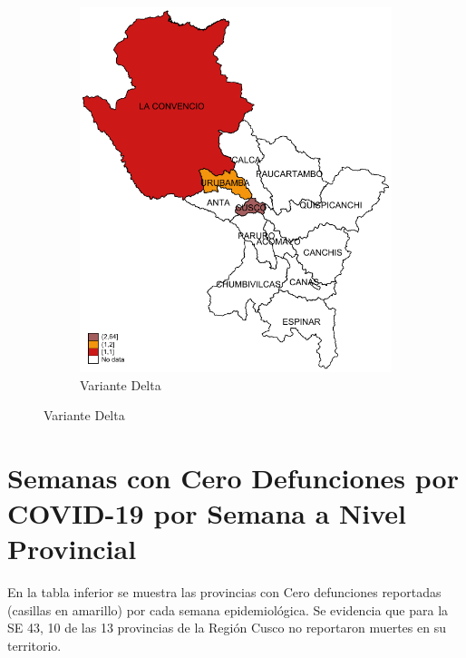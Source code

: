\documentclass[12pt,a4paper,openany]{book}
\begin{document}
\begin{figure}[h]
				\vspace{10mm}
				\begin{subfigure}[b]{0.40\textwidth}
					\centering
					\includegraphics[width=\textwidth]{../figuras/variantes_provincial_delta.pdf}
					\caption{Variante Delta}
				\end{subfigure}
			\end{figure}

\clearpage


\clearpage
	\section*{Semanas con Cero Defunciones por COVID-19 por Semana a Nivel Provincial}
	\noindent En la tabla inferior se muestra las provincias con Cero defunciones reportadas (casillas en amarillo) por cada semana epidemiológica. Se evidencia que para la SE 43, 10 de las 13 provincias de la Región Cusco no reportaron muertes en su territorio.
	
\end{document}
